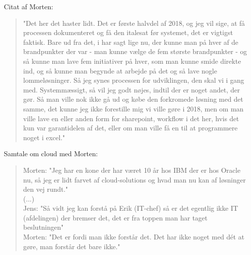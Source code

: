 Citat af Morten:
\begin{quote}
"Det her det haster lidt. Det er første halvdel af 2018, og jeg vil sige, at få processen dokumenteret og få den italesat før systemet, det er vigtigst faktisk. Bare ud fra det, i har sagt lige nu, der kunne man på hver af de brandpunkter der var - man kunne vælge de fem største brandpunkter - og så kunne man lave fem initiativer på hver, som man kunne smide direkte ind, og så kunne man begynde at arbejde på det og så lave nogle lommeløsninger. Så jeg synes processen for udviklingen, den skal vi i gang med. Systemmæssigt, så vil jeg godt nøjes, indtil der er noget andet, der gør. Så man ville nok ikke gå ud og købe den forkromede løsning med det samme, det kunne jeg ikke forestille mig vi ville gøre i 2018, men om man ville lave en eller anden form for sharepoint, workflow i det her, hvis det kun var garantidelen af det, eller om man ville få en til at programmere noget i excel."
\end{quote}
Samtale om cloud med Morten:
\begin{quote}
	Morten: "Jeg har en kone der har været 10 år hos IBM der er hos Oracle nu, så jeg er lidt farvet af cloud-solutions og hvad man nu kan af løsninger den vej rundt."
	\\
	(...)
	\\
	Jens: "Så vidt jeg kan forstå på Erik (IT-chef) så er det egentlig ikke IT (afdelingen) der bremser det, det er fra toppen man har taget beslutningen"
	\\
	Morten: "Det er fordi man ikke forstår det. Det har ikke noget med dét at gøre, man forstår det bare ikke."
\end{quote}